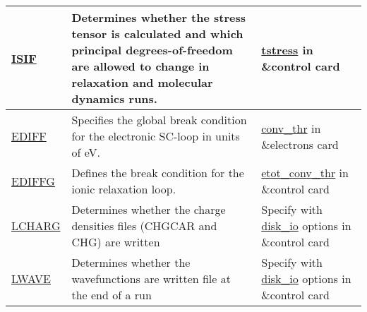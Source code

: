 \documentclass[12pt]{article}
\begin{document}
\begin{center}
\begin{table}[ht]
\begin{tabularx}{\linewidth}{|>{\RaggedRight}p{2.5cm}|x|x|}
 \href{https://www.vasp.at/wiki/index.php/ISIF}{ISIF} &
 Determines whether the stress tensor is calculated and which principal degrees-of-freedom are allowed to change in relaxation and molecular dynamics runs. &
 \href{https://www.quantum-espresso.org/Doc/INPUT_PW.html#idm735}{tstress} in \&control card \\ \hline
 
 \href{https://www.vasp.at/wiki/index.php/EDIFF}{EDIFF} &
 Specifies the global break condition for the electronic SC-loop in units of eV. &
 \href{https://www.quantum-espresso.org/Doc/INPUT_PW.html#idm771}{conv\_thr} in \&electrons card \\ \hline
 
 \href{https://www.vasp.at/wiki/index.php/EDIFFG}{EDIFFG} &
  Defines the break condition for the ionic relaxation loop. &
 \href{https://www.quantum-espresso.org/Doc/INPUT_PW.html#idm117}{etot\_conv\_thr} in \&control card \\ \hline
 
 \href{https://www.vasp.at/wiki/index.php/LCHARG}{LCHARG} &
 Determines whether the charge densities files (CHGCAR and CHG) are written &
 Specify with \href{https://www.quantum-espresso.org/Doc/INPUT_PW.html#idm1487}{disk\_io} options in \&control card \\ \hline
 
 \href{template.url}{LWAVE} &
 Determines whether the wavefunctions are written file at the end of a run &
 Specify with \href{https://www.quantum-espresso.org/Doc/INPUT_PW.html#idm1487}{disk\_io} options in \&control card \\ \hline
\end{tabularx}
\end{table}
\end{center}
\end{document}

